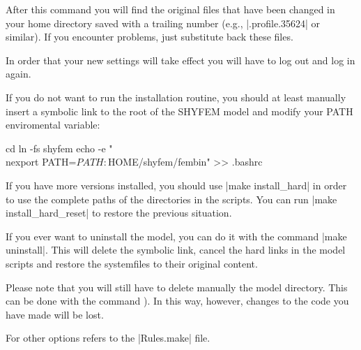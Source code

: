 After this command you will find the original files that have been changed
in your home directory saved with a trailing number (e.g., |.profile.35624|
or similar).  If you encounter problems, just substitute back these files.

In order that your new settings will take effect you will have to log
out and log in again.

If you do not want to run the installation routine, you should at least
manually insert a symbolic link to the root of the SHYFEM model and
modify your PATH enviromental variable:

\begin{codem}
    cd
    ln -fs \shydir shyfem
    echo -e "\\nexport PATH=$PATH:$HOME/shyfem/fembin" >> .bashrc
\end{codem}

If you have more versions installed, you should use |make install_hard|
in order to use the complete paths of the directories in the scripts.
You can run |make install_hard_reset| to restore the previous situation.

If you ever want to uninstall the model, you can do it with the command
|make uninstall|. This will delete the symbolic link, cancel the hard
links in the model scripts and restore the systemfiles \ttt{\sysfiles}
to their original content.

Please note that you will still have to delete manually the model
directory. This can be done with the command ). In
this way, however, changes to the code you have made will be lost.

For other options refers to the |Rules.make| file.
